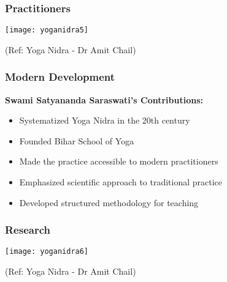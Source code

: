 \begin{frame}[fragile]\frametitle{Practitioners}
      \begin{center}
        \texttt{[image: yoganidra5]}

		{\tiny (Ref: Yoga Nidra - Dr Amit Chail)}		
        \end{center}

\end{frame}

\begin{frame}[fragile]\frametitle{Modern Development}
    \textbf{Swami Satyananda Saraswati's Contributions:}
    \begin{itemize}
        \item Systematized Yoga Nidra in the 20th century
        \item Founded Bihar School of Yoga
        \item Made the practice accessible to modern practitioners
        \item Emphasized scientific approach to traditional practice
        \item Developed structured methodology for teaching
    \end{itemize}
\end{frame}

\begin{frame}[fragile]\frametitle{Research}
      \begin{center}
        \texttt{[image: yoganidra6]}

		{\tiny (Ref: Yoga Nidra - Dr Amit Chail)}		
        \end{center}

\end{frame}

